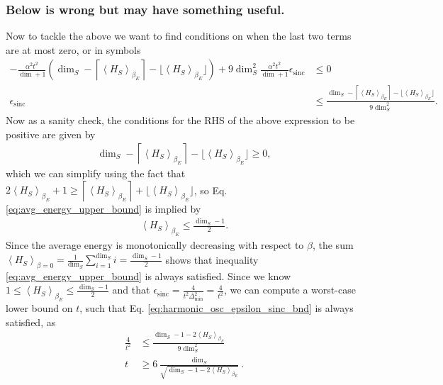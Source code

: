 \documentclass{article}
\newcommand{\parens}[1]{\left( #1 \right)}
\newcommand{\anglebrackets}[1]{\left< #1 \right>}
\newcommand{\ceil}[1]{\left\lceil #1 \right\rceil}
\DeclareMathOperator{\sinc}{sinc}
\begin{document}
\subsubsection{Below is wrong but may have something useful.}
Now to tackle the above we want to find conditions on when the last two terms are at most zero, or in symbols
\begin{align}
    - \frac{\alpha^2 t^2}{\dim + 1} \parens{\dim_S - \ceil{\anglebrackets{H_S}_{\beta_E}} - \lfloor \anglebrackets{H_S}_{\beta_E} \rfloor} + 9 \dim_S^2 \frac{\alpha^2 t^2}{\dim + 1} \epsilon_{\sinc} &\leq 0 \\
    \epsilon_{\sinc} &\leq \frac{\dim_S - \ceil{\anglebrackets{H_S}_{\beta_E}} - \lfloor \anglebrackets{H_S}_{\beta_E} \rfloor}{9 \dim_S^2}. \label{eq:harmonic_osc_epsilon_sinc_bnd}
\end{align}
Now as a sanity check, the conditions for the RHS of the above expression to be positive are given by
\begin{align}
    \dim_S - \ceil{\anglebrackets{H_S}_{\beta_E}} - \lfloor \anglebrackets{H_S}_{\beta_E} \rfloor \geq 0, \label{eq:avg_energy_upper_bound}
\end{align}
which we can simplify using the fact that $2\anglebrackets{H_S}_{\beta_E} + 1 \geq \ceil{\anglebrackets{H_S}_{\beta_E}} + \lfloor \anglebrackets{H_S}_{\beta_E} \rfloor $, so Eq. \eqref{eq:avg_energy_upper_bound} is implied by
\begin{align}
    \anglebrackets{H_S}_{\beta_E} \leq \frac{\dim_S - 1}{2}.
\end{align}
Since the average energy is monotonically decreasing with respect to $\beta$, the sum $\anglebrackets{H_S}_{\beta = 0} = \frac{1}{\dim_S} \sum_{i = 1}^{\dim_S} i = \frac{\dim_S - 1}{2}$ shows that inequality \eqref{eq:avg_energy_upper_bound} is always satisfied. Since we know $1 \leq \anglebrackets{H_S}_{\beta_E} \leq \frac{\dim_S - 1}{2}$ and that $\epsilon_{\sinc} = \frac{4}{t^2 \Delta_{\min}^2} = \frac{4}{t^2}$, we can compute a worst-case lower bound on $t$, such that Eq. \eqref{eq:harmonic_osc_epsilon_sinc_bnd} is always satisfied, as
\begin{align}
    \frac{4}{t^2} &\leq \frac{\dim_S - 1 - 2\anglebrackets{H_S}_{\beta_E}}{9 \dim_S^2} \\
    t &\geq 6 \frac{\dim_S}{\sqrt{\dim_S - 1 - 2 \anglebrackets{H_S}_{\beta_E}}}.
\end{align}
\end{document}

